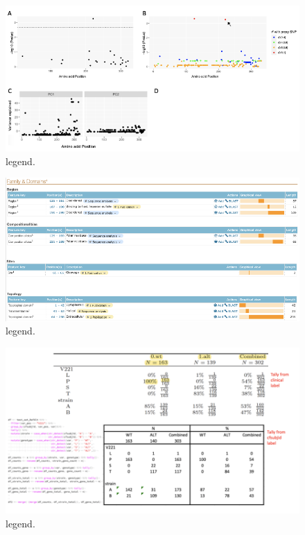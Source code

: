 \documentclass{article}
\begin{document}
\begin{figure}[ht] \hspace*{0cm}
    \includegraphics[scale=0.4]{f3}
	\caption{legend.}
	\label{fig:3} \end{figure}
	
	\begin{figure}[ht] \hspace*{0cm}
    \includegraphics[scale=0.4]{f4}
	\caption{legend.}
	\label{fig:4} \end{figure}
	
	\begin{figure}[ht] \hspace*{0cm}
    \includegraphics[scale=0.5]{fx}
	\caption{legend.}
	\label{fig:5} \end{figure}
	
\end{document}
